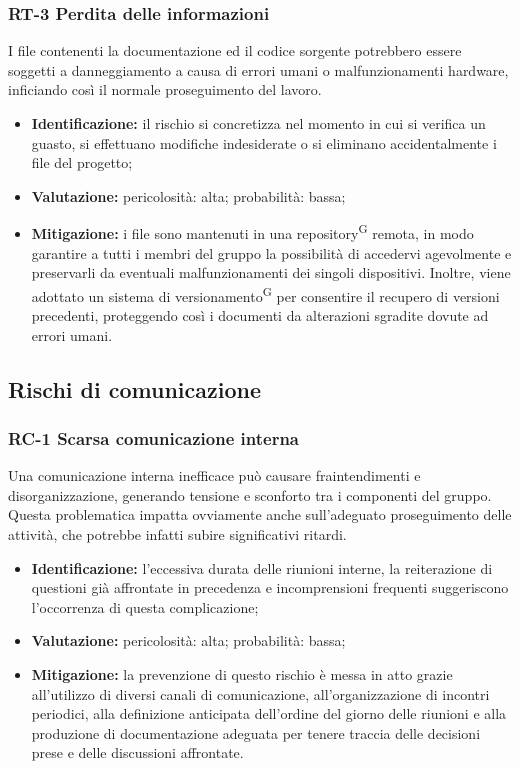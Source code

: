 \documentclass[8pt]{article}
\newcommand{\glossterm}[1]{#1\textsuperscript{G}} %
\begin{document}
\subsubsection{RT-3 Perdita delle informazioni}
I file contenenti la documentazione ed il codice sorgente potrebbero essere soggetti a danneggiamento a causa di errori umani o malfunzionamenti hardware, inficiando così il normale proseguimento del lavoro.
\begin{itemize}
\setlength\itemsep{0em}
    \item \textbf{Identificazione:} il rischio si concretizza nel momento in cui si verifica un guasto, si effettuano modifiche indesiderate o si eliminano accidentalmente i file del progetto;
    \item \textbf{Valutazione:} pericolosità: alta; probabilità: bassa;
    \item \textbf{Mitigazione:} i file sono mantenuti in una \glossterm{repository} remota, in modo garantire a tutti i membri del gruppo la possibilità di accedervi agevolmente e preservarli da eventuali malfunzionamenti dei singoli dispositivi. Inoltre, viene adottato un sistema di \glossterm{versionamento} per consentire il recupero di versioni precedenti, proteggendo così i documenti da alterazioni sgradite dovute ad errori umani. 
\end{itemize}

\subsection{Rischi di comunicazione}
\subsubsection{RC-1 Scarsa comunicazione interna}
Una comunicazione interna inefficace può causare fraintendimenti e disorganizzazione, generando tensione e sconforto tra i componenti del gruppo. Questa problematica impatta ovviamente anche sull'adeguato proseguimento delle attività, che potrebbe infatti subire significativi ritardi.
\begin{itemize}
\setlength\itemsep{0em}
    \item \textbf{Identificazione:} l'eccessiva durata delle riunioni interne, la reiterazione di questioni già affrontate in precedenza e incomprensioni frequenti suggeriscono l'occorrenza di questa complicazione;
    \item \textbf{Valutazione:} pericolosità: alta; probabilità: bassa;
    \item \textbf{Mitigazione:} la prevenzione di questo rischio è messa in atto grazie all'utilizzo di diversi canali di comunicazione, all'organizzazione di incontri periodici, alla definizione anticipata dell'ordine del giorno delle riunioni e alla produzione di documentazione adeguata per tenere traccia delle decisioni prese e delle discussioni affrontate.
\end{itemize}
\end{document}
